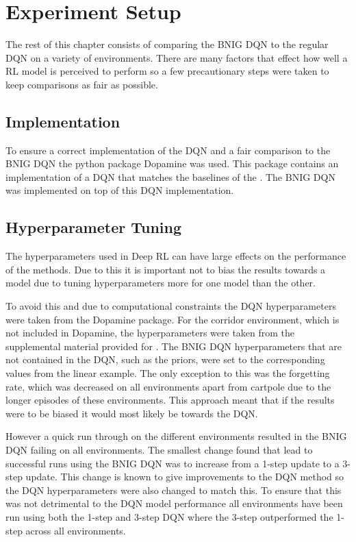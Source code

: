 \section{Experiment Setup}

The rest of this chapter consists of comparing the BNIG DQN to the regular DQN on a variety of environments. There are many factors that effect how well a RL model is perceived to perform so a few precautionary steps were taken to keep comparisons as fair as possible. 

\subsection{Implementation}

To ensure a correct implementation of the DQN and a fair comparison to the BNIG DQN the python package Dopamine\citep{castro_18} was used. This package contains an implementation of a DQN that matches the baselines of the \cite{mnih_2015}. The BNIG DQN was implemented on top of this DQN implementation.

\subsection{Hyperparameter Tuning}

The hyperparameters used in Deep RL can have large effects on the performance of the methods. Due to this it is important not to bias the results towards a model due to tuning hyperparameters more for one model than the other. 

To avoid this and due to computational constraints the DQN hyperparameters were taken from the Dopamine package. For the corridor environment, which is not included in Dopamine, the hyperparameters were taken from the supplemental material provided for \cite{osband_2018}. The BNIG DQN hyperparameters that are not contained in the DQN, such as the priors, were set to the corresponding values from the linear example. The only exception to this was the forgetting rate, which was decreased on all environments apart from cartpole due to the longer episodes of these environments. This approach meant that if the results were to be biased it would most likely be towards the DQN.

However a quick run through on the different environments resulted in the BNIG DQN failing on all environments. The smallest change found that lead to successful runs using the BNIG DQN was to increase from a 1-step update to a 3-step update. This change is known to give improvements to the DQN method \citep{hessel_2017} so the DQN hyperparameters were also changed to match this. To ensure that this was not detrimental to the DQN model performance all environments have been run using both the 1-step and 3-step DQN where the 3-step outperformed the 1-step across all environments.

